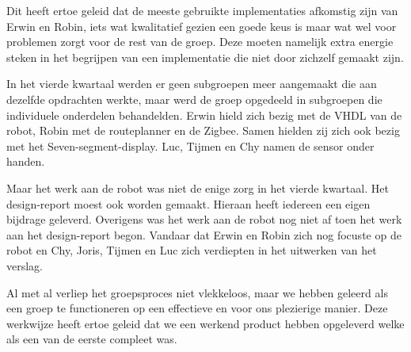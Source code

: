 \documentclass{report}
\begin{document}
Dit heeft ertoe geleid dat de meeste gebruikte implementaties afkomstig zijn van Erwin en Robin, iets wat kwalitatief gezien een goede keus is maar wat wel voor problemen zorgt voor de rest van de groep. Deze moeten namelijk extra energie steken in het begrijpen van een implementatie die niet door zichzelf gemaakt zijn.
\newline

In het vierde kwartaal werden er geen subgroepen meer aangemaakt die aan dezelfde opdrachten werkte, maar werd de groep opgedeeld in subgroepen die individuele onderdelen behandelden. Erwin hield zich bezig met de VHDL van de robot, Robin met de routeplanner en de Zigbee. Samen hielden zij zich ook bezig met het Seven-segment-display. Luc, Tijmen en Chy namen de sensor onder handen.
\newline

Maar het werk aan de robot was niet de enige zorg in het vierde kwartaal. Het design-report moest ook worden gemaakt. Hieraan heeft iedereen een eigen bijdrage geleverd. Overigens was het werk aan de robot nog niet af toen het werk aan het design-report begon. Vandaar dat Erwin en Robin zich nog focuste op de robot en Chy, Joris, Tijmen en Luc zich verdiepten in het uitwerken van het verslag.
\newline

Al met al verliep het groepsproces niet vlekkeloos, maar we hebben geleerd als een groep te functioneren op een effectieve en voor ons plezierige manier. Deze werkwijze heeft ertoe geleid dat we een werkend product hebben opgeleverd welke als een van de eerste compleet was.
\end{document}
